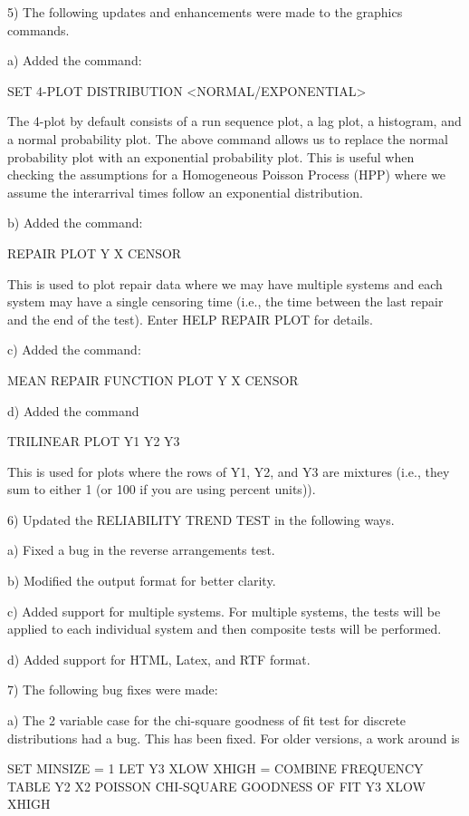 { 5) The following updates and enhancements were made to
    the graphics commands.

    a) Added the command:

          SET 4-PLOT DISTRIBUTION <NORMAL/EXPONENTIAL>

       The 4-plot by default consists of a run sequence plot,
       a lag plot, a histogram, and a normal probability plot.
       The above command allows us to replace the normal
       probability plot with an exponential probability plot.
       This is useful when checking the assumptions for a
       Homogeneous Poisson Process (HPP) where we assume the
       interarrival times follow an exponential distribution.

    b) Added the command:

          REPAIR PLOT Y X CENSOR

       This is used to plot repair data where we may have
       multiple systems and each system may have a single
       censoring time (i.e., the time between the last repair
       and the end of the test).  Enter HELP REPAIR PLOT
       for details.

    c) Added the command:

          MEAN REPAIR FUNCTION PLOT Y X CENSOR

    d) Added the command

          TRILINEAR PLOT Y1 Y2 Y3

       This is used for plots where the rows of Y1, Y2, and
       Y3 are mixtures (i.e., they sum to either 1 (or 100
       if you are using percent units)).

 6) Updated the RELIABILITY TREND TEST in the following
    ways.

    a) Fixed a bug in the reverse arrangements test.

    b) Modified the output format for better clarity.

    c) Added support for multiple systems.  For multiple systems,
       the tests will be applied to each individual system and
       then composite tests will be performed.

    d) Added support for HTML, Latex, and RTF format.

 7) The following bug fixes were made:

    a) The 2 variable case for the chi-square goodness of fit
       test for discrete distributions had a bug.  This has
       been fixed.  For older versions, a work around is

           SET MINSIZE = 1
           LET Y3 XLOW XHIGH = COMBINE FREQUENCY TABLE Y2 X2
           POISSON CHI-SQUARE GOODNESS OF FIT Y3 XLOW XHIGH

}
